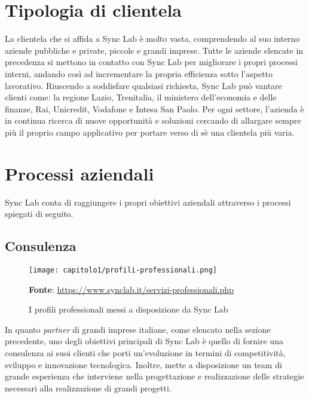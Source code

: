 \section{Tipologia di clientela}
La clientela che si affida a Sync Lab è molto vasta, comprendendo al suo interno aziende pubbliche e private, piccole e grandi imprese. Tutte le aziende elencate in precedenza si mettono in contatto con Sync Lab per migliorare i propri processi interni, andando così ad incrementare la propria efficienza sotto l'aspetto lavorativo. Riuscendo a soddisfare qualsiasi richiesta, Sync Lab può vantare clienti come: la regione Lazio, Trenitalia, il ministero dell'economia e delle finanze, Rai, Unicredit, Vodafone e Intesa San Paolo. Per ogni settore, l'azienda è in continua ricerca di nuove opportunità e soluzioni cercando di allargare sempre più il proprio campo applicativo per portare verso di sè una clientela più varia.

\section{Processi aziendali}
Sync Lab conta di raggiungere i propri obiettivi aziendali attraverso i processi spiegati di seguito.

\subsection{Consulenza}

\begin{figure}[!h]
  \centering
  \texttt{[image: capitolo1/profili-professionali.png]}
  \caption{I profili professionali messi a disposizione da Sync Lab}
  \textbf{Fonte}: \href{https://www.synclab.it/servizi-professionali.php}{https://www.synclab.it/servizi-professionali.php}
\end{figure}

In quanto \emph{partner} di grandi imprese italiane, come elencato nella sezione precedente, uno degli obiettivi principali di Sync Lab è quello di fornire una consulenza ai suoi clienti che porti un'evoluzione in termini di competitività, sviluppo e innovazione tecnologica. Inoltre, mette a disposizione un team di grande esperienza che interviene nella progettazione e realizzazione delle strategie necessari alla realizzazione di grandi progetti.

